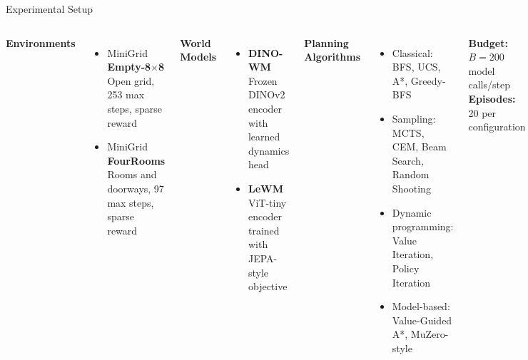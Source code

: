 \documentclass[aspectratio=169, 11pt]{beamer}
\newcommand{\lewm}{\textcolor{LeWMc}{\textbf{LeWM}}\xspace}
\newcommand{\dino}{\textcolor{DINOc}{\textbf{DINO-WM}}\xspace}
\begin{document}
\begin{frame}{Experimental Setup}

  \begin{columns}[T]

    \textbf{Environments}
    \begin{itemize}
      \item MiniGrid \textbf{Empty-8$\times$8}\\
            {\small Open grid, 253 max steps, sparse reward}
      \vspace{0.5em}
      \item MiniGrid \textbf{FourRooms}\\
            {\small Rooms and doorways, 97 max steps, sparse reward}
    \end{itemize}

    \textbf{World Models}
    \begin{itemize}
      \item \dino\\
            {\small Frozen DINOv2 encoder\\with learned dynamics head}
      \vspace{0.5em}
      \item \lewm\\
            {\small ViT-tiny encoder\\trained with JEPA-style objective}
    \end{itemize}

    \textbf{Planning Algorithms}
    \begin{itemize}\small
      \item Classical: BFS, UCS, A*, Greedy-BFS
      \item Sampling: MCTS, CEM, Beam Search, Random Shooting
      \item Dynamic programming: Value Iteration, Policy Iteration
      \item Model-based: Value-Guided A*, MuZero-style
    \end{itemize}
    \vspace{0.5em}
    {\small \textbf{Budget:} $B = 200$ model calls/step\\
    \textbf{Episodes:} 20 per configuration}

  \end{columns}

\end{frame}
\end{document}
